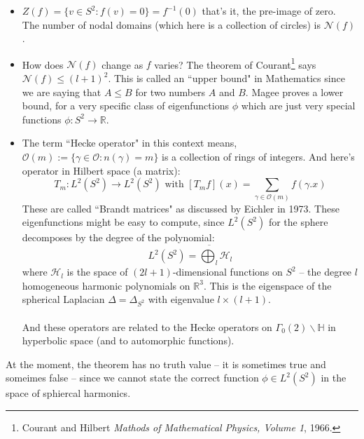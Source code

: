 \documentclass[12pt]{article}
\begin{document}
\begin{itemize}
	\item $Z(f) = \{ v \in S^2 : f(v) = 0 \} = f^{-1}(0)$ that's it, the pre-image of zero. \\ 
	The number of nodal domains (which here is a collection of circles) is $\mathcal{N}(f)$.
	\item How does $\mathcal{N}(f)$ change as $f$ varies?  The theorem of Courant\footnote{Courant and Hilbert \textit{Mathods of Mathematical Physics, Volume 1}, 1966.} says $\mathcal{N}(f) \leq (l+1)^2$.  This is called an ``upper bound" in Mathematics since we are saying that $A \leq B$ for two numbers $A$ and $B$. Magee proves a lower bound, for a very specific class of eigenfunctions $\phi$ which are just very special functions $\phi: S^2 \to \mathbb{R}$.
	\item The term ``Hecke operator" in this context means, $\mathcal{O}(m) := \{ \gamma \in \mathcal{O}: n(\gamma) = m \}$ is a collection of rings of integers. And here's operator in Hilbert space (a matrix):
	$$ T_m: L^2(S^2) \to L^2(S^2) \text{ with }
	[T_m f](x) = \sum_{\gamma \in \mathcal{O}(m)} f(\gamma.x) $$
	These are called ``Brandt matrices" as discussed by Eichler in 1973.  These eigenfunctions might be easy to compute, since $L^2(S^2)$ for the sphere decomposes by the degree of the polynomial:
	$$ L^2(S^2) = \overline{\bigoplus_l} \mathcal{H}_l $$
	where $\mathcal{H}_l$ is the space of $(2l+1)$-dimensional functions on $S^2$ -- the degree $l$ homogeneous harmonic polynomials on $\mathbb{R}^3$.  This is the eigenspace of the spherical Laplacian $\Delta = \Delta_{S^2}$ with eigenvalue $l \times (l+1)$. \\ \\
And these operators are related to the Hecke operators on $\Gamma_0(2)\backslash \mathbb{H}$ in hyperbolic space (and to automorphic functions).   
\end{itemize}
At the moment, the theorem has no truth value -- it is sometimes true and someimes false -- since we cannot state the correct function  $ \phi \in L^2(S^2)$ in the space of sphiercal harmonics.
\vfill 
\end{document}

